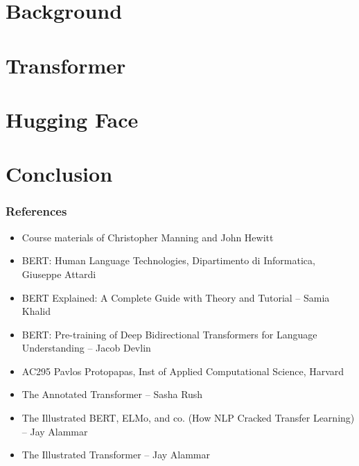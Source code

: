 \section[Back]{Background}


\section[Trs]{Transformer}


% 

% 

\section[HF]{Hugging Face}


\section[Cncl]{Conclusion}


\begin{frame}[fragile]\frametitle{References}
		\begin{itemize}
		\item Course materials of Christopher Manning and John Hewitt
		\item BERT: Human Language Technologies, Dipartimento di Informatica, Giuseppe Attardi
		\item BERT Explained: A Complete Guide with Theory and Tutorial – Samia Khalid
		\item BERT: Pre-training of Deep Bidirectional Transformers for Language Understanding – Jacob Devlin
		\item AC295 Pavlos Protopapas, Inst of Applied Computational Science, Harvard
		\item The Annotated Transformer – Sasha Rush
		\item The Illustrated BERT, ELMo, and co. (How NLP Cracked Transfer Learning) – Jay Alammar
		\item The Illustrated Transformer – Jay Alammar
		\end{itemize}
\end{frame}
